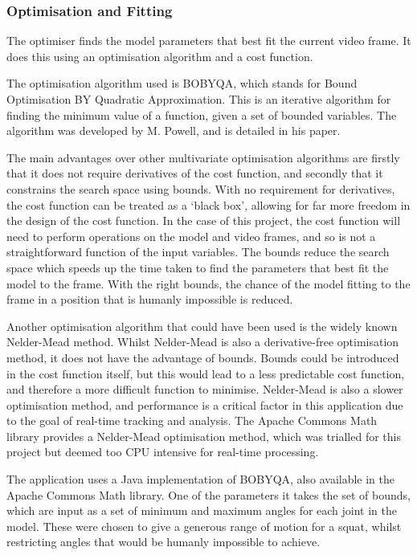 \subsubsection{Optimisation and Fitting}

The optimiser finds the model parameters that best fit the current video frame. It does this using an optimisation algorithm and a cost function.

The optimisation algorithm used is BOBYQA, which stands for Bound Optimisation BY Quadratic Approximation. This is an iterative algorithm for finding the minimum value of a function, given a set of bounded variables. The algorithm was developed by M. Powell, and is detailed in his paper\cite{bobyqa}.

The main advantages over other multivariate optimisation algorithms are firstly that it does not require derivatives of the cost function, and secondly that it constrains the search space using bounds. With no requirement for derivatives, the cost function can be treated as a `black box', allowing for far more freedom in the design of the cost function. In the case of this project, the cost function will need to perform operations on the model and video frames, and so is not a straightforward function of the input variables. The bounds reduce the search space which speeds up the time taken to find the parameters that best fit the model to the frame. With the right bounds, the chance of the model fitting to the frame in a position that is humanly impossible is reduced.

Another optimisation algorithm that could have been used is the widely known Nelder-Mead method\cite{neldermead}. Whilst Nelder-Mead is also a derivative-free optimisation method, it does not have the advantage of bounds. Bounds could be introduced in the cost function itself, but this would lead to a less predictable cost function, and therefore a more difficult function to minimise. Nelder-Mead is also a slower optimisation method, and performance is a critical factor in this application due to the goal of real-time tracking and analysis. The Apache Commons Math library\cite{apachemath} provides a Nelder-Mead optimisation method, which was trialled for this project but deemed too CPU intensive for real-time processing.

The application uses a Java implementation of BOBYQA, also available in the Apache Commons Math library\cite{apachemath}. One of the parameters it takes the set of bounds, which are input as a set of minimum and maximum angles for each joint in the model. These were chosen to give a generous range of motion for a squat, whilst restricting angles that would be humanly impossible to achieve.

